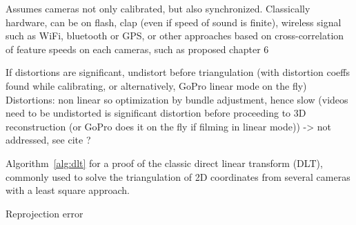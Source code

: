 Assumes cameras not only calibrated, but also synchronized. Classically hardware, can be on flash, clap (even if speed of sound is finite), wireless signal such as WiFi, bluetooth or GPS, or other approaches based on cross-correlation of feature speeds on each cameras, such as proposed chapter 6

If distortions are significant, undistort before triangulation (with distortion coeffs found while calibrating, or alternatively, GoPro linear mode on the fly)
Distortions: non linear so optimization by bundle adjustment, hence slow (videos need to be undistorted is significant distortion before proceeding to 3D reconstruction (or GoPro does it on the fly if filming in linear mode)) -> not addressed, see cite ? 


Algorithm~\ref{alg:dlt} for a proof of the classic direct linear transform (DLT), commonly used to solve the triangulation of 2D coordinates from several cameras with a least square approach.

Reprojection error

